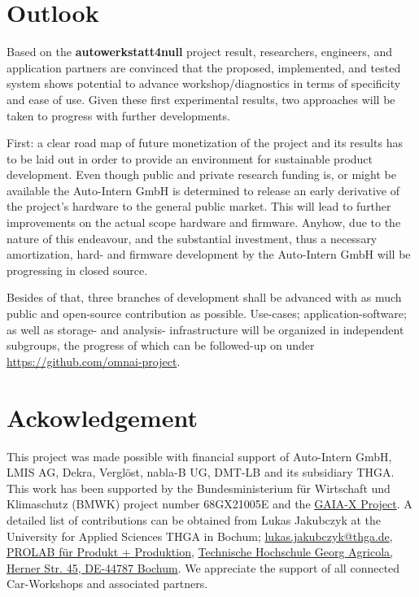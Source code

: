 \section{Outlook}
Based on the \textbf{autowerkstatt4null} project result, researchers, engineers, and application partners are convinced that the proposed, 
implemented, and tested system shows potential to advance workshop/diagnostics in terms of specificity and ease of use.
Given these first experimental results, two approaches will be taken to progress with further developments. 

First: a clear road map of future monetization of the project and its results has to be laid out in order to provide an environment for sustainable product development. 
Even though public and private research funding is, or might be available the Auto-Intern GmbH is determined to release an early derivative of the project's hardware to the general public market. 
This will lead to further improvements on the actual scope hardware and firmware. 
Anyhow, due to the nature of this endeavour, and the substantial investment, thus a necessary amortization, hard- and firmware development by the Auto-Intern GmbH will be progressing in closed source. 

Besides of that, three branches of development shall be advanced with as much public and open-source contribution as possible. 
Use-cases; application-software; as well as storage- and analysis- infrastructure will be organized in independent subgroups, 
the progress of which can be followed-up on under \url{https://github.com/omnai-project}.

\section{Ackowledgement}
This project was made possible with financial support of Auto-Intern GmbH, LMIS AG, Dekra, Verglöst, nabla-B UG, DMT-LB and its subsidiary THGA.
This work has been supported by the Bundesministerium für Wirtschaft und Klimaschutz (BMWK) project number 68GX21005E and the \href{https://gaia-x.eu/}{GAIA-X Project}.
A detailed list of contributions can be obtained from Lukas Jakubczyk at the University for Applied Sciences THGA in Bochum; \href{mailto:lukas.jakubczyk@thga.de}{lukas.jakubczyk@thga.de}, \href{https://www.thga.de/forschung/maschinenbau-und-materialwissenschaften/labore/prolab-produkt-produktion}{PROLAB für Produkt + Produktion}, \href{https://maps.app.goo.gl/tQA3Qfn5f6gGqMHg8}{Technische Hochschule Georg Agricola, Herner Str. 45, DE-44787 Bochum}.
We appreciate the support of all connected Car-Workshops and associated partners. 





